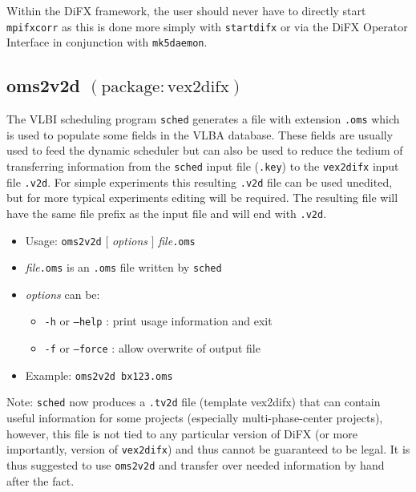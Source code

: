 Within the DiFX framework, the user should never have to directly start {\tt mpifxcorr} as this is done more simply with {\tt startdifx} or via the DiFX Operator Interface in conjunction with {\tt mk5daemon}.










\subsection{oms2v2d {\small $\mathrm{(package: vex2difx)}$} \label{sec:oms2v2d}}

The VLBI scheduling program {\tt sched} generates a file with extension {\tt .oms} which is used to populate some fields in the VLBA database.
These fields are usually used to feed the dynamic scheduler but can also be used to reduce the tedium of transferring information from the {\tt sched} input file ({\tt .key}) to the {\tt vex2difx} input file {\tt .v2d}.
For simple experiments this resulting {\tt .v2d} file can be used unedited, but for more typical experiments editing will be required.
The resulting file will have the same file prefix as the input file and will end with {\tt .v2d}.

\begin{itemize}
\item[] Usage: {\tt oms2v2d} $[$ {\em options} $]$ {\em file}{\tt .oms}

\item[] {\em file}{\tt .oms} is an {\tt .oms} file written by {\tt sched}
\item[] {\em options} can be:
\begin{itemize}
\item[] {\tt -h} or {\tt --help} : print usage information and exit
\item[] {\tt -f} or {\tt --force} : allow overwrite of output file
\end{itemize}
\item[] Example: {\tt oms2v2d bx123.oms}
\end{itemize}

\noindent
Note: {\tt sched} now produces a {\tt .tv2d} file (template vex2difx) that can contain useful information for some projects (especially multi-phase-center projects), however, this file is not tied to any particular version of DiFX (or more importantly, version of {\tt vex2difx}) and thus cannot be guaranteed to be legal.
It is thus suggested to use {\tt oms2v2d} and transfer over needed information by hand after the fact.







